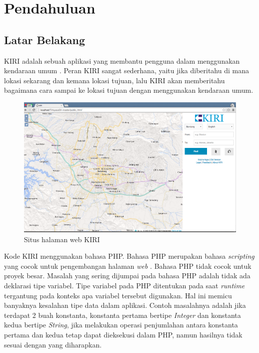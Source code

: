 \chapter{Pendahuluan}
\label{chap:pendahuluan}

\section{Latar Belakang}
\label{sec:latarbelakang}

KIRI adalah sebuah aplikasi yang membantu pengguna dalam menggunakan kendaraan umum \cite{statickiri}. Peran KIRI sangat sederhana, yaitu jika diberitahu di mana lokasi sekarang dan kemana lokasi tujuan, lalu KIRI akan memberitahu bagaimana cara sampai ke lokasi tujuan dengan menggunakan kendaraan umum. 

\begin{figure}[H]
	\centering
		\includegraphics[scale=0.3]{Gambar/KIRI-main-5.png}
	\caption{Situs halaman web KIRI}
	\label{fig:1_kiritravel}
\end{figure}


Kode KIRI \cite{githubkiri} menggunakan bahasa PHP. Bahasa PHP merupakan bahasa \textit{scripting} yang cocok untuk pengembangan halaman \textit{web} \cite{phpnet}. Bahasa PHP tidak cocok untuk proyek besar. Masalah yang sering dijumpai pada bahasa PHP adalah tidak ada deklarasi tipe variabel. Tipe variabel pada PHP ditentukan pada saat \textit{runtime} tergantung pada konteks apa variabel tersebut digunakan. Hal ini memicu banyaknya kesalahan tipe data dalam aplikasi. Contoh masalahnya adalah jika terdapat 2 buah konstanta, konstanta pertama bertipe \textit{Integer} dan konstanta kedua bertipe \textit{String}, jika melakukan operasi penjumlahan antara konstanta pertama dan kedua tetap dapat dieksekusi dalam PHP, namun hasilnya tidak sesuai dengan yang diharapkan.

